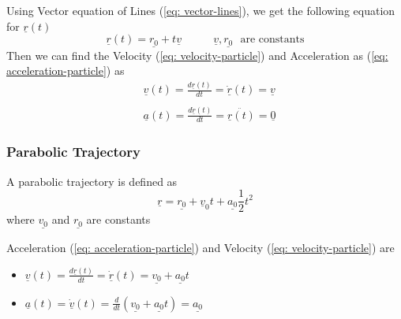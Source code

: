 \begin{mycenter}
\end{mycenter}

Using Vector equation of Lines (\ref{eq: vector-lines}), we get the following equation for $\underline{r}(t)$
$$\underline{r}(t) = \underline{r_{0}} + t\underline{v} \ \ \ \ \ \ \ \ \ \ \ \ \ \underline{v}, \underline{r_{0}}\ \ \ \text{are constants}$$
Then we can find the Velocity (\ref{eq: velocity-particle}) and Acceleration as (\ref{eq: acceleration-particle}) as
$$\begin{aligned}                          & \underline{v}(t) = \frac{d\underline{r}(t)}{dt} = \underline{\dot{r}}(t) = \underline{v}        \\ \\
                                         & \underline{a}(t) = \frac{d\underline{\dot{r}}(t)}{dt} = \ddot{\underline{r}(t)} = \underline{0}\end{aligned}$$

\subsubsection{Parabolic Trajectory}
\begin{definition}
	A parabolic trajectory is defined as
	\begin{equation}
		\label{eq: parabolic-trajectory}
		\underline{r} = \underline{r_{0}}+ \underline{v}_{0}t + \underline{a_{0}}\frac{1}{2}t^2
	\end{equation}
	where $\underline{v_0}$ and $\underline{r_0}$ are constants
\end{definition}
Acceleration (\ref{eq: acceleration-particle}) and Velocity (\ref{eq: velocity-particle}) are
\begin{itemize}
	\item $\displaystyle \underline{v}(t) = \frac{d\underline{r}(t)}{dt} = \underline{\dot{r}}(t) = \underline{v_{0}} + \underline{a_{0}}t$
	\item $\displaystyle \underline{a}(t) = \underline{\dot{v}}(t) = \frac{d}{dt}(\underline{v_{0}} + \underline{a_{0}}t) = \underline{a_0}$
\end{itemize}

